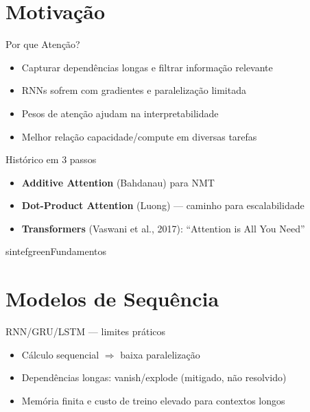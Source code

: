 \documentclass{beamer}
\begin{document}
\section{Motivação}
\begin{frame}{Por que Atenção?}
\begin{itemize}[<+->]
  \item Capturar dependências longas e filtrar informação relevante
  \item RNNs sofrem com gradientes e paralelização limitada
  \item Pesos de atenção ajudam na interpretabilidade
  \item Melhor relação capacidade/compute em diversas tarefas
\end{itemize}
\end{frame}

\begin{frame}{Histórico em 3 passos}
\begin{itemize}[<+->]
  \item \textbf{Additive Attention} (Bahdanau) para NMT
  \item \textbf{Dot-Product Attention} (Luong) — caminho para escalabilidade
  \item \textbf{Transformers} (Vaswani et al., 2017): “Attention is All You Need”
\end{itemize}
\end{frame}

\begin{chapter}{sintefgreen}{Fundamentos}\end{chapter}

\section{Modelos de Sequência}
\begin{frame}{RNN/GRU/LSTM — limites práticos}
\begin{itemize}[<+->]
  \item Cálculo sequencial $\Rightarrow$ baixa paralelização
  \item Dependências longas: vanish/explode (mitigado, não resolvido)
  \item Memória finita e custo de treino elevado para contextos longos
\end{itemize}
\end{frame}
\end{document}
